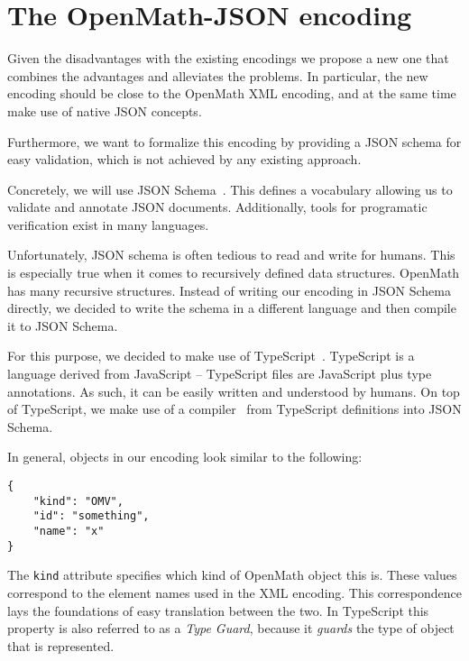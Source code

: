 \section{The OpenMath-JSON encoding}\label{sec:encoding}

Given the disadvantages with the existing encodings we propose a new one that combines the advantages and alleviates the problems. 
In particular, the new encoding should be close to the OpenMath XML encoding, and at the same time make use of native JSON concepts.

Furthermore, we want to formalize this encoding by providing a JSON schema for easy validation, which is not achieved by any existing approach.

Concretely, we will use JSON Schema~\cite{handrewsjsonschema:18}. 
This defines a vocabulary allowing us to validate and annotate JSON documents. 
Additionally, tools for programatic verification exist in many languages.

Unfortunately, JSON schema is often tedious to read and write for humans. 
This is especially true when it comes to recursively defined data structures.
OpenMath has many recursive structures.
Instead of writing our encoding in JSON Schema directly, we decided to write the schema in a different language and then compile it to JSON Schema. 

For this purpose, we decided to make use of TypeScript~\cite{typescript:webpage}. 
TypeScript is a language derived from JavaScript -- TypeScript files are JavaScript plus type annotations. 
As such, it can be easily written and understood by humans. 
On top of TypeScript, we make use of a compiler~\cite{vega-ts-jscon-schema-generator:webpage} from TypeScript definitions into JSON Schema. 

In general, objects in our encoding look similar to the following:
\\\begin{minipage}{\linewidth}
\begin{lstlisting}
{
    "kind": "OMV",
    "id": "something",
    "name": "x"
}
\end{lstlisting}\end{minipage}

The \texttt{kind} attribute specifies which kind of OpenMath object this is. 
These values correspond to the element names used in the XML encoding. 
This correspondence lays the foundations of easy translation between the two. 
In TypeScript this property is also referred to as a \textit{Type Guard}, because it \textit{guards} the type of object that is represented. 

